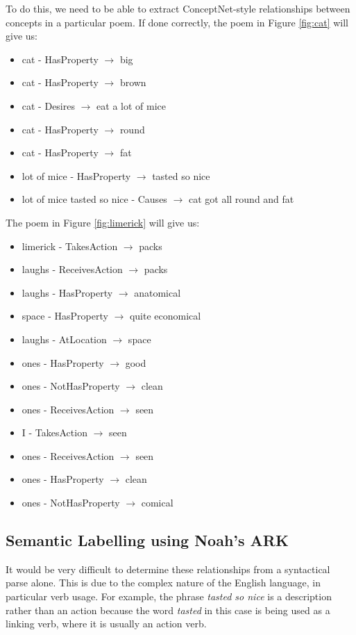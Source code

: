 To do this, we need to be able to extract ConceptNet-style relationships between concepts in a particular poem. If done correctly, the poem in Figure \ref{fig:cat} will give us: 
\begin{itemize}
\item{cat - HasProperty $\rightarrow$ big}
\item{cat - HasProperty $\rightarrow$ brown}
\item{cat - Desires $\rightarrow$ eat a lot of mice}
\item{cat - HasProperty $\rightarrow$ round}
\item{cat - HasProperty $\rightarrow$ fat}
\item{lot of mice - HasProperty $\rightarrow$ tasted so nice}
\item{lot of mice tasted so nice - Causes $\rightarrow$ cat got all round and fat}
\end{itemize}

The poem in Figure \ref{fig:limerick} will give us:
\begin{itemize}
\item{limerick - TakesAction $\rightarrow$ packs}
\item{laughs - ReceivesAction $\rightarrow$ packs}
\item{laughs - HasProperty $\rightarrow$ anatomical}
\item{space - HasProperty $\rightarrow$ quite economical}
\item{laughs - AtLocation $\rightarrow$ space}
\item{ones - HasProperty $\rightarrow$ good}
\item{ones - NotHasProperty $\rightarrow$ clean}
\item{ones - ReceivesAction $\rightarrow$ seen}
\item{I - TakesAction $\rightarrow$ seen}
\item{ones - ReceivesAction $\rightarrow$ seen}
\item{ones - HasProperty $\rightarrow$ clean}
\item{ones - NotHasProperty $\rightarrow$ comical}
\end{itemize}


\subsection{Semantic Labelling using Noah's ARK}

It would be very difficult to determine these relationships from a syntactical parse alone. This is due to the complex nature of the English language, in particular verb usage. For example, the phrase \textit{tasted so nice} is a description rather than an action because the word \textit{tasted} in this case is being used as a linking verb, where it is usually an action verb.

